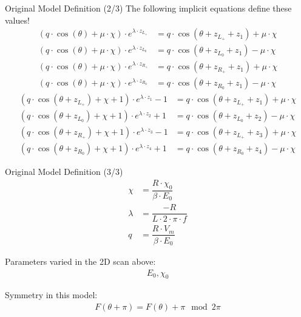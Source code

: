 \begin{frame}{Original Model Definition (2/3)}
    The following implicit equations define these values!
    \begin{subequations}
        \begin{align}
            (q \cdot \cos(\theta) + \mu \cdot \chi) \cdot e^{\lambda \cdot z_{L_+}}
             & = q \cdot \cos(\theta + z_{L_+} + z_1) + \mu \cdot \chi \\
            (q \cdot \cos(\theta) + \mu \cdot \chi) \cdot e^{\lambda \cdot z_{L_0}}
             & = q \cdot \cos(\theta + z_{L_0} + z_1) - \mu \cdot \chi \\
            (q \cdot \cos(\theta) + \mu \cdot \chi) \cdot e^{\lambda \cdot z_{R_+}}
             & = q \cdot \cos(\theta + z_{R_+} + z_1) + \mu \cdot \chi \\
            (q \cdot \cos(\theta) + \mu \cdot \chi) \cdot e^{\lambda \cdot z_{R_0}}
             & = q \cdot \cos(\theta + z_{R_0} + z_1) - \mu \cdot \chi
        \end{align}
    \end{subequations}
    \vspace{-2em}
    \begin{subequations}
        \begin{align}
            (q \cdot \cos(\theta + z_{L_+}) + \chi + 1) \cdot e^{\lambda \cdot z_1} - 1
             & = q \cdot  \cos(\theta + z_{L_+} + z_1) + \mu \cdot \chi \\
            (q \cdot \cos(\theta + z_{L_0}) + \chi + 1) \cdot e^{\lambda \cdot z_2} + 1
             & = q \cdot  \cos(\theta + z_{L_0} + z_2) - \mu \cdot \chi \\
            (q \cdot \cos(\theta + z_{R_+}) + \chi + 1) \cdot e^{\lambda \cdot z_3} - 1
             & = q \cdot  \cos(\theta + z_{L_+} + z_3) + \mu \cdot \chi \\
            (q \cdot \cos(\theta + z_{R_0}) + \chi + 1) \cdot e^{\lambda \cdot z_4} + 1
             & = q \cdot  \cos(\theta + z_{R_0} + z_4) - \mu \cdot \chi
        \end{align}
    \end{subequations}
\end{frame}

\begin{frame}{Original Model Definition (3/3)}
    \vspace{-3.0em}
    \begin{align}
        \chi    & = \dfrac{R \cdot \chi_0}{\beta \cdot E_0} \\
        \lambda & = \dfrac{-R}{L \cdot 2 \cdot \pi \cdot f} \\
        q       & = \dfrac{R \cdot V_m}{\beta \cdot E_0}
    \end{align}

    Parameters varied in the 2D scan above:
    \begin{align*}
        E_0, \chi_0
    \end{align*}

    Symmetry in this model:
    \begin{align}
        F(\theta + \pi) = F(\theta) + \pi \mod 2 \pi
    \end{align}
\end{frame}

